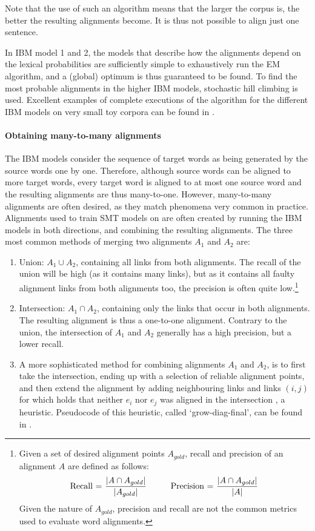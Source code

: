 \noindent Note that the use of such an algorithm means that the larger the corpus is, the better the resulting alignments become. It is thus not possible to align just one sentence.

In IBM model 1 and 2, the models that describe how the alignments depend on the lexical probabilities are sufficiently simple to exhaustively run the EM algorithm, and a (global) optimum is thus guaranteed to be found. To find the most probable alignments in the higher IBM models, stochastic hill climbing is used. Excellent examples of complete executions of the algorithm for the different IBM models on very small toy corpora can be found in \cite[p88-113]{koehn2008statistical}.

\paragraph{Obtaining many-to-many alignments}
The IBM models consider the sequence of target words as being generated by the source words one by one. Therefore, although source words can be aligned to more target words, every target word is aligned to at most one source word and the resulting alignments are thus many-to-one. However, many-to-many alignments are often desired, as they match phenomena very common in practice. Alignments used to train SMT models on are often created by running the IBM models in both directions, and combining the resulting alignments. The three most common methods of merging two alignments $A_1$ and $A_2$ are:\begin{enumerate}
\item Union: $A_1\cup A_2$, containing all links from both alignments. The recall of the union will be high (as it contains many links), but as it contains all faulty alignment links from both alignments too, the precision is often quite low.\footnote{Given a set of desired alignment points $A_{gold}$, recall and precision of an alignment $A$ are defined as follows:\\
$$\text{Recall = }\frac{|A \cap A_{gold}|}{|A_{gold}|} \text{\hspace{10mm}Precision = }\frac{|A \cap A_{gold}|}{|A|}$$
Given the nature of $A_{gold}$, precision and recall are not the common metrics used to evaluate word alignments.}
\item Intersection: $A_1\cap A_2$, containing only the links that occur in both alignments. The resulting alignment is thus a one-to-one alignment. Contrary to the union, the intersection of $A_1$ and $A_2$ generally has a high precision, but a lower recall.
\item A more sophisticated method for combining alignments $A_1$ and $A_2$, is to first take the intersection, ending up with a selection of reliable alignment points, and then extend the alignment by adding neighbouring links and links $(i,j)$ for which holds that neither $e_i$ nor $e_j$ was aligned in the intersection \citep{och2000improved}, a heuristic. Pseudocode of this heuristic, called `grow-diag-final', can be found in \cite{koehn2008statistical}.
\end{enumerate}

